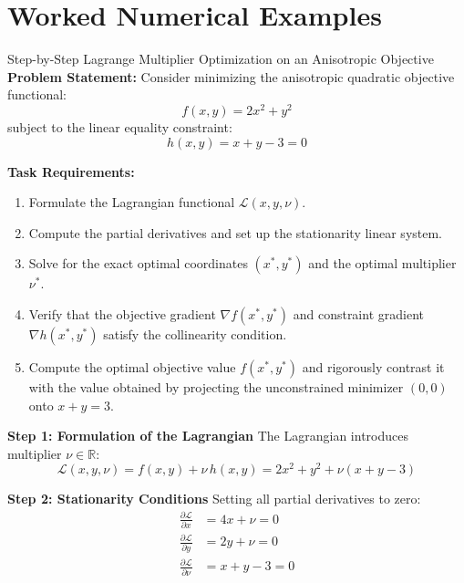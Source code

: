 \section{Worked Numerical Examples}

\begin{examplebox}[breakable]{Step-by-Step Lagrange Multiplier Optimization on an Anisotropic Objective}
\textbf{Problem Statement:}
Consider minimizing the anisotropic quadratic objective functional:
\begin{equation}
f(x, y) = 2x^2 + y^2
\end{equation}
subject to the linear equality constraint:
\begin{equation}
h(x, y) = x + y - 3 = 0
\end{equation}

\textbf{Task Requirements:}
\begin{enumerate}
    \item Formulate the Lagrangian functional $\mathcal{L}(x, y, \nu)$.
    \item Compute the partial derivatives and set up the stationarity linear system.
    \item Solve for the exact optimal coordinates $(x^*, y^*)$ and the optimal multiplier $\nu^*$.
    \item Verify that the objective gradient $\nabla f(x^*, y^*)$ and constraint gradient $\nabla h(x^*, y^*)$ satisfy the collinearity condition.
    \item Compute the optimal objective value $f(x^*, y^*)$ and rigorously contrast it with the value obtained by projecting the unconstrained minimizer $(0, 0)$ onto $x + y = 3$.
\end{enumerate}

\tcblower

\textbf{Step 1: Formulation of the Lagrangian}
The Lagrangian introduces multiplier $\nu \in \mathbb{R}$:
\begin{equation}
\mathcal{L}(x, y, \nu) = f(x, y) + \nu \, h(x, y) = 2x^2 + y^2 + \nu(x + y - 3)
\end{equation}

\textbf{Step 2: Stationarity Conditions}
Setting all partial derivatives to zero:
\begin{align}
\frac{\partial \mathcal{L}}{\partial x} &= 4x + \nu = 0 \label{eq:ex_stat_x} \\
\frac{\partial \mathcal{L}}{\partial y} &= 2y + \nu = 0 \label{eq:ex_stat_y} \\
\frac{\partial \mathcal{L}}{\partial \nu} &= x + y - 3 = 0 \label{eq:ex_stat_nu}
\end{align}


\end{examplebox}
